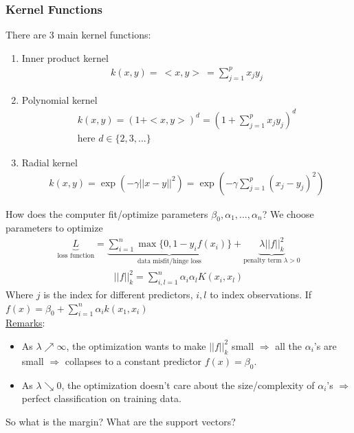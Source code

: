 \documentclass[12pt, letterpaper]{article}
\begin{document}
\subsubsection{Kernel Functions}
There are 3 main kernel functions:
\begin{enumerate}
    \item Inner product kernel 
    \begin{align*}
        k(x,y) =\ <x,y>\ = \sum_{j=1}^{p}x_j y_j
    \end{align*}
    \item Polynomial kernel
    \begin{align*}
        k(x,y) = (1+<x,y>)^d = (1 + \sum_{j=1}^{p}x_jy_j)^d \\
        \text{here } d \in \{2,3,...\}
    \end{align*}
    \item Radial kernel
    \begin{align*}
        k(x,y) = \exp(-\gamma ||x-y||^2) = \exp(-\gamma\sum_{j=1}^{p}(x_j-y_j)^2)
    \end{align*}
\end{enumerate}
How does the computer fit/optimize parameters $\beta_0, \alpha_1, ..., \alpha_n$? 
We choose parameters to optimize 
\begin{align*}
    \underbrace{L}_{\text{loss function}} = \underbrace{\sum_{i=1}^{n}\max \{0,1-y_if(x_i)\}}_\text{data misfit/hinge loss} + \underbrace{\lambda ||f||^2_k}_{\text{penalty term } \lambda > 0 }
\end{align*}
\begin{align*}
    ||f||^2_k = \sum_{i,l = 1}^{n} \alpha_i \alpha_l K(x_i,x_l)
\end{align*}
Where $j$ is the index for different predictors, $i,l$ to index observations. If 
$f(x) = \beta_0 + \sum_{i=1}^{n} \alpha_i k(x_1,x_i)$\\ 
\underline{Remarks}:
\begin{itemize}
    \item As $\lambda \nearrow \infty$, the optimization wants to make $||f||^2_k$ small
    $\Rightarrow$ all the $\alpha_i$'s are small $\Rightarrow$ collapses to a constant predictor 
    $f(x) = \beta_0$.
    \item As $\lambda \searrow 0$, the optimization doesn't care about the size/complexity of
    $\alpha_i$'s $\Rightarrow$ perfect classification on training data.
\end{itemize}
So what is the margin? What are the support vectors? \\
\end{document}
